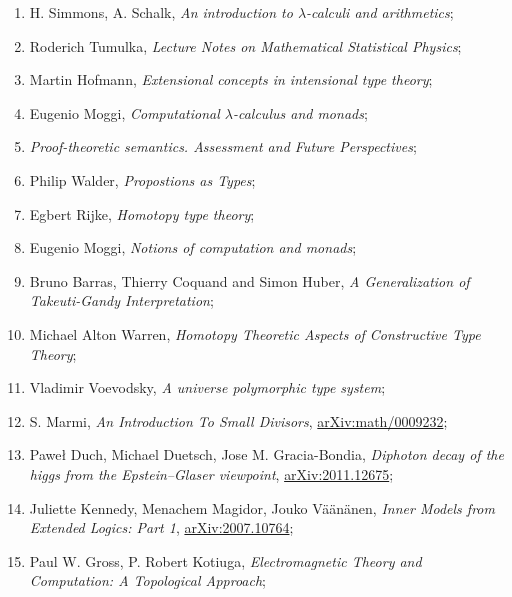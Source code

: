 \documentclass[a4paper,11pt]{article}
\begin{document}
\begin{enumerate}
\item H. Simmons, A. Schalk, \emph{An introduction to
    $\lambda$-calculi and arithmetics};

\item Roderich Tumulka, \emph{Lecture Notes on Mathematical
    Statistical Physics};

\item Martin Hofmann, \emph{Extensional concepts in intensional type
    theory};

\item Eugenio Moggi, \emph{Computational $\lambda$-calculus and monads};

\item \emph{Proof-theoretic semantics. Assessment and Future
    Perspectives};

\item Philip Walder, \emph{Propostions as Types};

\item Egbert Rijke, \emph{Homotopy type theory};

\item Eugenio Moggi, \emph{Notions of computation and monads};

\item Bruno Barras, Thierry Coquand and Simon Huber, \emph{A
    Generalization of Takeuti-Gandy Interpretation};

\item Michael Alton Warren, \emph{Homotopy Theoretic Aspects of
    Constructive Type Theory};

\item Vladimir Voevodsky, \emph{A universe polymorphic type system};

\item S. Marmi, \emph{An Introduction To Small Divisors},
  \href{https://arxiv.org/abs/math/0009232v1}{arXiv:math/0009232};

\item Paweł Duch, Michael Duetsch, Jose M. Gracia-Bondia,
  \emph{Diphoton decay of the higgs from the Epstein--Glaser
    viewpoint},
  \href{https://arxiv.org/abs/2011.12675v2}{arXiv:2011.12675};

\item Juliette Kennedy, Menachem Magidor, Jouko V\"{a}\"{a}n\"{a}nen,
  \emph{ Inner Models from Extended Logics: Part 1},
  \href{https://arxiv.org/abs/2007.10764}{arXiv:2007.10764};

\item Paul W. Gross, P. Robert Kotiuga, \emph{Electromagnetic Theory
    and Computation: A Topological Approach};


\end{enumerate}
\end{document}
